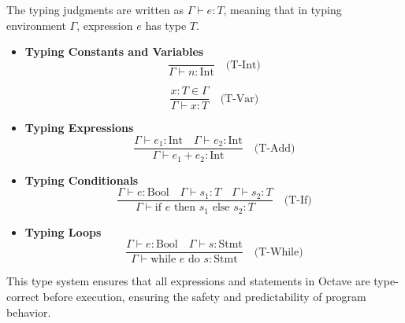 \documentclass[letterpaper,12pt]{article}
\begin{document}
The typing judgments are written as \(\Gamma \vdash e : T\), meaning that in typing environment \(\Gamma\), expression \(e\) has type \(T\).

\begin{itemize}
    \item \textbf{Typing Constants and Variables}
    \[
    \frac{}{\Gamma \vdash n : \text{Int}} \quad \text{(T-Int)}
    \]
    
    \[
    \frac{x : T \in \Gamma}{\Gamma \vdash x : T} \quad \text{(T-Var)}
    \]

    \item \textbf{Typing Expressions}
    \[
    \frac{\Gamma \vdash e_1 : \text{Int} \quad \Gamma \vdash e_2 : \text{Int}}{\Gamma \vdash e_1 + e_2 : \text{Int}} \quad \text{(T-Add)}
    \]

    \item \textbf{Typing Conditionals}
    \[
    \frac{\Gamma \vdash e : \text{Bool} \quad \Gamma \vdash s_1 : T \quad \Gamma \vdash s_2 : T}{\Gamma \vdash \text{if } e \text{ then } s_1 \text{ else } s_2 : T} \quad \text{(T-If)}
    \]

    \item \textbf{Typing Loops}
    \[
    \frac{\Gamma \vdash e : \text{Bool} \quad \Gamma \vdash s : \text{Stmt}}{\Gamma \vdash \text{while } e \text{ do } s : \text{Stmt}} \quad \text{(T-While)}
    \]
\end{itemize}

This type system ensures that all expressions and statements in Octave are type-correct before execution, ensuring the safety and predictability of program behavior.















  
\end{document}
